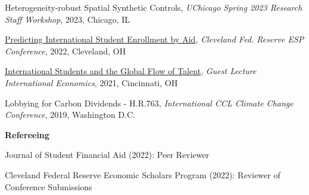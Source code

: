 \documentclass[a4paper,20pt]{article}
\begin{document}
     \begin{description}[font=$\bullet$]
        \vspace{-7pt}
	\item{Heterogeneity-robust Spatial Synthetic Controls, \textit{UChicago Spring 2023 Research Staff Workshop}, 2023, Chicago, IL}
        \vspace{-7pt}
        \item{\href{https://posmikdc.github.io/pdf/PosmikDaniel_ESPPresentation.pdf}{Predicting International Student Enrollment by Aid}, \textit{Cleveland Fed. Reserve ESP Conference}, 2022, Cleveland, OH}
        \vspace{-7pt}
        \item{\href{https://posmikdc.github.io/pdf/Posmik_GuestLecture_ECON4040.pdf}{International Students and the Global Flow of Talent}, \textit{Guest Lecture International Economics}, 2021, Cincinnati, OH}
        \vspace{-7pt}
        \item{Lobbying for Carbon Dividends - H.R.763, \textit{International CCL Climate Change Conference}, 2019, Washington D.C.}
\end{description}

\vspace{-5pt}
    \begin{minipage}{.75\linewidth} \begin{flushleft}
        \textbf{Refereeing}
    \end{flushleft} \end{minipage}
    
     \begin{description}[font=$\bullet$]
        \vspace{-7pt}
	\item{Journal of Student Financial Aid (2022): Peer Reviewer}
         \vspace{-7pt}
	\item{Cleveland Federal Reserve Economic Scholars Program (2022): Reviewer of Conference Submissions}
\end{description}

\vspace{-5pt}
\end{document}
